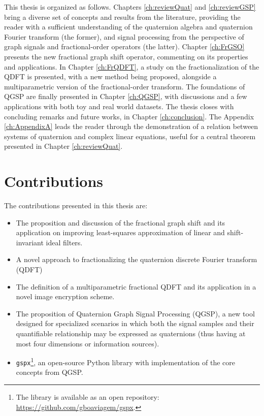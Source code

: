 This thesis is organized as follows. Chapters \ref{ch:reviewQuat} and \ref{ch:reviewGSP} bring a diverse set of concepts and results from the literature, providing the reader with a sufficient understanding of the quaternion algebra and quaternion Fourier transform (the former), and signal processing from the perspective of graph signals and fractional-order operators (the latter).
Chapter \ref{ch:FrGSO} presents the new fractional graph shift operator, commenting on its properties and applications.
In Chapter \ref{ch:FrQDFT}, a study on the fractionalization of the QDFT is presented, with a new method being proposed, alongside a multiparametric version of the fractional-order transform.
The foundations of QGSP are finally presented in Chapter \ref{ch:QGSP}, with discussions and a few applications with both toy and real world datasets.
The thesis closes with concluding remarks and future works, in Chapter \ref{ch:conclusion}. The Appendix \ref{ch:AppendixA} leads the reader through the demonstration of a relation between systems of quaternion and complex linear equations, useful for a central theorem presented in Chapter \ref{ch:reviewQuat}.

\section{Contributions}
The contributions presented in this thesis are:

\begin{itemize}[noitemsep]
    \item The proposition and discussion of the fractional graph shift and its application on improving least-squares approximation of linear and shift-invariant ideal filters.
    \item A novel approach to fractionalizing the quaternion discrete Fourier transform (QDFT)
    \item The definition of a multiparametric fractional QDFT and its application in a novel image encryption scheme.
    \item The proposition of Quaternion Graph Signal Processing (QGSP), a new tool designed for specialized scenarios in which both the signal samples and their quantifiable relationship may be expressed as quaternions (thus having at most four dimensions or information sources).
    \item \texttt{gspx}\footnote{The library is available as an open repository: \url{https://github.com/gboaviagem/gspx}.}, an open-source Python library with implementation of the core concepts from QGSP.
\end{itemize}

